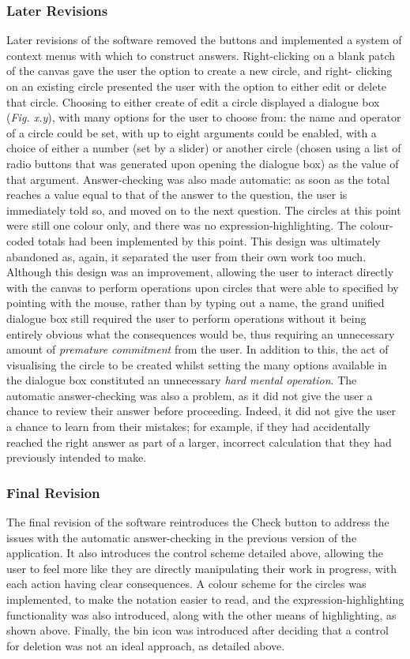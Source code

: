 \documentclass[12pt,twoside,notitlepage,xetex]{report}
\begin{document}
\subsubsection{Later Revisions}
Later revisions of the software removed the buttons and implemented a system of
context menus with which to construct answers. Right-clicking on a blank patch
of the canvas gave the user the option to create a new circle, and right-
clicking on an existing circle presented the user with the option to either
edit or delete that circle.  Choosing to either create of edit a circle
displayed a dialogue box (\emph{Fig. x.y}), with many options for the user to
choose from: the name and operator of a circle could be set, with up to eight
arguments could be enabled, with a choice of either a number (set by a slider)
or another circle (chosen using a list of radio buttons that was generated upon
opening the dialogue box) as the value of that argument.  Answer-checking was
also made automatic: as soon as the total reaches a value equal to that of the
answer to the question, the user is immediately told so, and moved on to the
next question.  The circles at this point were still one colour only, and there
was no expression-highlighting.  The colour-coded totals had been implemented by
this point.  This design was ultimately abandoned as, again, it separated the
user from their own work too much.  Although this design was an improvement,
allowing the user to interact directly with the canvas to perform operations
upon circles that were able to specified by pointing with the mouse, rather
than by typing out a name, the grand unified dialogue box still required the
user to perform operations without it being entirely obvious what the
consequences would be, thus requiring an unnecessary amount of
\emph{premature commitment} from the user.  In addition to this, the act of
visualising the circle to be created whilst setting the many options available
in the dialogue box constituted an unnecessary \emph{hard mental operation}.
The automatic answer-checking was also a problem, as it did not give the user a
chance to review their answer before proceeding.  Indeed, it did not give the
user a chance to learn from their mistakes; for example, if they had
accidentally reached the right answer as part of a larger, incorrect
calculation that they had previously intended to make.

\subsubsection{Final Revision}
The final revision of the software reintroduces the {\sfapp Check}
button to address the issues with the automatic answer-checking in the
previous version of the application.  It also introduces the control scheme
detailed above, allowing the user to feel more like they are directly
manipulating their work in progress, with each action having clear
consequences.  A colour scheme for the circles was implemented, to make the
notation easier to read, and the expression-highlighting functionality was also
introduced, along with the other means of highlighting, as shown above.
Finally, the bin icon was introduced after deciding that a control for deletion
was not an ideal approach, as detailed above.
\end{document}
